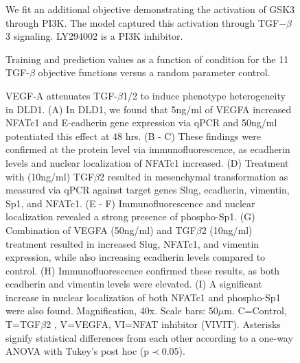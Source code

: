 \documentclass[11pt,letterpaper]{article}
\begin{document}
\begin{figure}
\caption{We fit an additional objective demonstrating the activation of GSK3 through PI3K. The model captured this activation through TGF$-\beta$3 signaling. LY294002 is a PI3K inhibitor.} 
\label{fg:gsk3_alone}
\end{figure}


\begin{figure}
  \caption{Training and prediction values as a function of condition for the 11 TGF-$\beta$ objective functions versus a random parameter control.}\label{fg:ObjTable}
\end{figure}

\begin{figure}
\caption{VEGF-A attenuates TGF-$\beta$1/2 to induce phenotype heterogeneity in DLD1.
(A) In DLD1, we found that 5ng/ml of VEGFA increased NFATc1 and E-cadherin gene expression via qPCR and 50ng/ml potentiated this effect at 48 hrs.
(B - C) These findings were confirmed at the protein level via immunofluorescence, as ecadherin levels and nuclear localization of NFATc1 increased.
(D) Treatment with (10ng/ml) TGF$\beta$2 resulted in mesenchymal transformation as measured via qPCR against target genes Slug, ecadherin, vimentin, Sp1, and NFATc1.
(E - F) Immunofluorescence and nuclear localization revealed a strong presence of phospho-Sp1.
(G) Combination of VEGFA (50ng/ml) and TGF$\beta$2 (10ng/ml) treatment resulted in increased Slug, NFATc1, and vimentin expression, while also increasing ecadherin levels compared to control.
(H) Immunofluorescence confirmed these results, as both ecadherin and vimentin levels were elevated.
(I) A significant increase in nuclear localization of both NFATc1 and phospho-Sp1 were also found.
Magnification, 40x. Scale bars: 50$\mu$m.  C=Control, T=TGF$\beta$2 , V=VEGFA, VI=NFAT inhibitor (VIVIT).
Asterisks signify statistical differences from each other according to a one-way ANOVA with Tukey's post hoc (p$\prec$0.05).}\label{fg:S4}
\end{figure}
\end{document}
